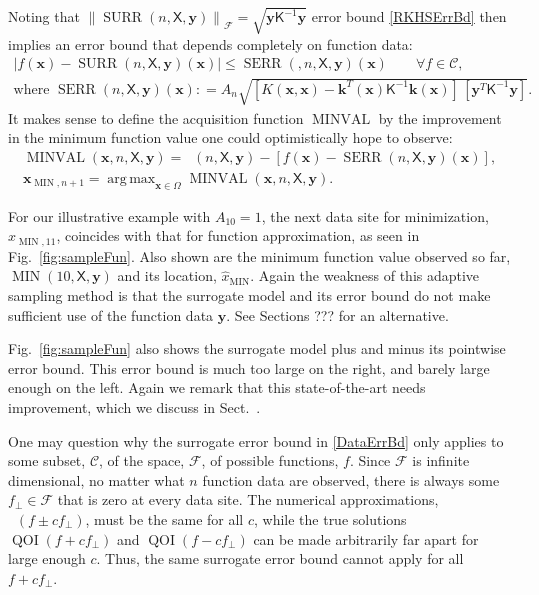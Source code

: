 \documentclass[11pt]{NSFamsart}
\DeclareMathOperator*{\argmax}{arg\,max}
\DeclareMathOperator{\QOI}{QOI}
\DeclareMathOperator{\APP}{\widehat{\QOI}}
\DeclareMathOperator{\SURR}{SURR}
\DeclareMathOperator{\MIN}{MIN}
\DeclareMathOperator{\APPMIN}{\widehat{\MIN}}
\DeclareMathOperator{\MINVAL}{MINVAL}
\DeclareMathOperator{\SURRERR}{SERR}
\newcommand{\mK}{\mathsf{K}}
\newcommand{\mX}{\mathsf{X}}
\newcommand{\bx}{{\boldsymbol{x}}}
\newcommand{\bk}{{\boldsymbol{k}}}
\newcommand{\by}{{\boldsymbol{y}}}
\newcommand{\calc}{{\mathcal{C}}}
\newcommand{\calf}{{\mathcal{F}}}
\def\abs#1{\ensuremath{\left \lvert #1 \right \rvert}}
\newcommand{\bignorm}[2][{}]{\ensuremath{\bigl \lVert #2 \bigr \rVert}_{#1}}
\begin{document}
Noting that $\bignorm[\calf]{\SURR(n,\mX,\by)} = \sqrt{\by \mK^{-1} \by}$ error bound \eqref{RKHSErrBd} then implies an error bound that depends completely on function data: 
\begin{subequations} \label{DataErrBd}
\begin{gather}
    \abs{f(\bx) - \SURR(n,\mX,\by)(\bx)} \le \SURRERR(,n,\mX,\by)(\bx) \qquad \forall f \in \calc, \\
        \label{DataErrBda} 
   \text{where } \SURRERR(n,\mX,\by)(\bx) : = A_n \sqrt{[K(\bx,\bx) - \bk^T(\bx) \mK^{-1} \bk(\bx)] \, [\by^T \mK^{-1} \by] }.
\end{gather}
\end{subequations}
It makes sense to define the acquisition function $\MINVAL$ by the improvement in the minimum function value one could optimistically hope to observe:
\begin{subequations} \label{eq:minvaldef}
\begin{gather} 
    \MINVAL(\bx,n,\mX,\by) = \APPMIN(n,\mX,\by) - [f(\bx) - \SURRERR(n,\mX,\by)(\bx)], \\
    \bx_{\MIN, n+1} = \argmax_{\bx \in \Omega} \MINVAL(\bx,n,\mX,\by).
\end{gather}
\end{subequations}

For our illustrative example with $A_{10} = 1$, the next data site for minimization, $x_{\MIN,11}$, coincides with that for function approximation, as seen in Fig.\ \ref{fig:sampleFun}.  Also shown are the minimum function value observed so far, $\MIN(10,\mX,\by)$ and its location, $\widehat{x}_{\MIN}$.  Again the weakness of this adaptive sampling method is that the surrogate model and its error bound do not make sufficient use of the function data $\by$.  See Sections ??? for an alternative.

Fig.\ \ref{fig:sampleFun} also shows the surrogate model plus and minus its pointwise error bound.  This error bound is much too large on the right, and barely large enough on the left.  Again we remark that this state-of-the-art needs improvement, which we discuss in Sect.\ .

One may question why the surrogate error bound in \eqref{DataErrBd} only applies to some subset, $\calc$, of the space, $\calf$, of possible functions, $f$.  Since $\calf$ is infinite dimensional, no matter what $n$ function data are observed, there is always some $f_\perp \in\calf$ that is zero at every data site.  The numerical approximations, $\APP(f \pm c f_\perp)$, must be the same for all $c$, while the true solutions  $\QOI(f + c f_\perp)$ and  $\QOI(f - c f_\perp)$ can be made arbitrarily far apart for large enough $c$.  Thus, the same surrogate error bound cannot apply for all $f + c f_\perp$.
\end{document}

